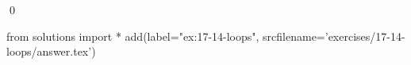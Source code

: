 
\begin{ex}
  \label{ex:17-14-loops}
  
  \qed
\end{ex}
\begin{python0}
from solutions import *
add(label="ex:17-14-loops",
    srcfilename='exercises/17-14-loops/answer.tex')
\end{python0}
